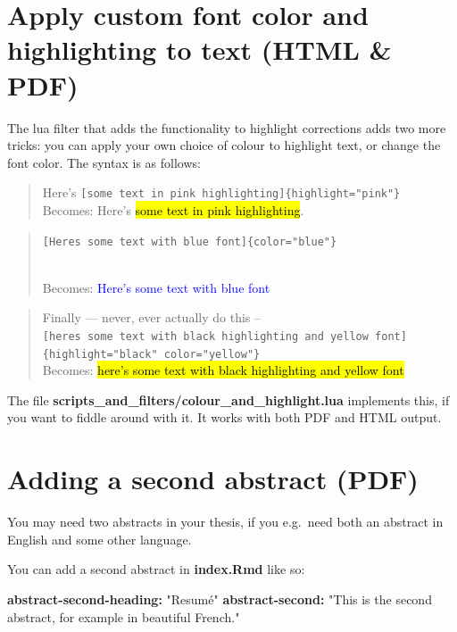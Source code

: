\documentclass[a4paper, nobind]{templates/ociamthesis}
\newenvironment{Shaded}{\begin{snugshade}}{\end{snugshade}}
\newcommand{\AttributeTok}[1]{\textcolor[rgb]{0.13,0.29,0.53}{#1}}
\newcommand{\FunctionTok}[1]{\textcolor[rgb]{0.13,0.29,0.53}{\textbf{#1}}}
\newcommand{\KeywordTok}[1]{\textcolor[rgb]{0.13,0.29,0.53}{\textbf{#1}}}
\newcommand{\StringTok}[1]{\textcolor[rgb]{0.31,0.60,0.02}{#1}}
\renewenvironment{Shaded}
{
  \vspace{10pt}%
  \begin{snugshade}%
}{%
  \end{snugshade}%
  \vspace{8pt}%
}
\begin{document}
\section{Apply custom font color and highlighting to text (HTML \& PDF)}\label{apply-custom-font-color-and-highlighting-to-text-html-pdf}

The lua filter that adds the functionality to highlight corrections adds two more tricks:
you can apply your own choice of colour to highlight text, or change the font color.
The syntax is as follows:

\begin{quote}
Here's \texttt{{[}some\ text\ in\ pink\ highlighting{]}\{highlight="pink"\}}\\
Becomes: Here's \hl{some text in pink highlighting}.
\end{quote}

\begin{quote}
\texttt{{[}Here\textquotesingle{}s\ some\ text\ with\ blue\ font{]}\{color="blue"\}}\strut \\
Becomes: \textcolor{blue}{Here's some text with blue font}
\end{quote}

\begin{quote}
Finally --- never, ever actually do this -- \texttt{{[}here\textquotesingle{}s\ some\ text\ with\ black\ highlighting\ and\ yellow\ font{]}\{highlight="black"\ color="yellow"\}}\\
Becomes: \textcolor{yellow}{\hl{here's some text with black highlighting and yellow font}}
\end{quote}

The file \textbf{scripts\_and\_filters/colour\_and\_highlight.lua} implements this, if you want to fiddle around with it.
It works with both PDF and HTML output.

\section{Adding a second abstract (PDF)}\label{adding-a-second-abstract-pdf}

You may need two abstracts in your thesis, if you e.g.~need both an abstract in English and some other language.

You can add a second abstract in \textbf{index.Rmd} like so:

\begin{Shaded}
\begin{Highlighting}[]
\FunctionTok{abstract{-}second{-}heading}\KeywordTok{:}\AttributeTok{ }\StringTok{"Resumé"}
\FunctionTok{abstract{-}second}\KeywordTok{:}\AttributeTok{ }\StringTok{"This is the second abstract, for example in beautiful French."}\AttributeTok{ }
\end{Highlighting}
\end{Shaded}
\end{document}
